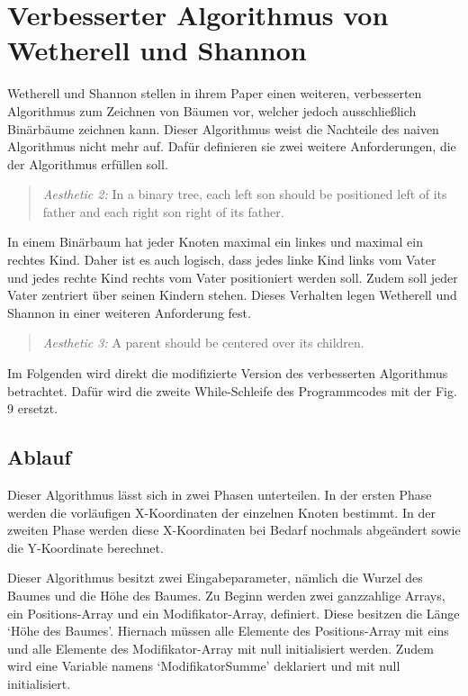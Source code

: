\label{chap:kapitel3_2}
\section{Verbesserter Algorithmus von Wetherell und Shannon}
Wetherell und Shannon stellen in ihrem Paper einen weiteren, verbesserten Algorithmus zum Zeichnen von Bäumen vor, welcher jedoch
ausschließlich Binärbäume zeichnen kann. Dieser Algorithmus weist die Nachteile des naiven Algorithmus nicht mehr auf.
Dafür definieren sie zwei weitere Anforderungen, die der Algorithmus erfüllen soll.   

\begin{quotation}
	\textit{Aesthetic 2:} In a binary tree, each left son should be positioned
	left of its father and each right son right of its father.\cite[]{q1}
\end{quotation}

In einem Binärbaum hat jeder Knoten maximal ein linkes und maximal ein rechtes Kind. Daher ist es auch logisch, dass jedes linke Kind 
links vom Vater und jedes rechte Kind rechts vom Vater positioniert werden soll. Zudem soll jeder Vater zentriert über seinen Kindern
stehen. Dieses Verhalten legen Wetherell und Shannon in einer weiteren Anforderung fest.

\begin{quotation}
	\textit{Aesthetic 3:} A parent should be centered over its children.\cite[]{q1}
\end{quotation}

Im Folgenden wird direkt die modifizierte Version des verbesserten Algorithmus betrachtet. Dafür wird die zweite While-Schleife des Programmcodes
mit der Fig. 9 \cite[A modification of Algorithm 3]{q1} ersetzt.

\subsection{Ablauf}

Dieser Algorithmus lässt sich in zwei Phasen unterteilen. In der ersten Phase werden die vorläufigen X-Koordinaten der einzelnen Knoten bestimmt.
In der zweiten Phase werden diese X-Koordinaten bei Bedarf nochmals abgeändert sowie die Y-Koordinate berechnet.

Dieser Algorithmus besitzt zwei Eingabeparameter, nämlich die Wurzel des Baumes und die Höhe des Baumes. Zu Beginn werden zwei
ganzzahlige Arrays, ein Positions-Array und ein Modifikator-Array, definiert. Diese besitzen die Länge ‘Höhe des Baumes’.
Hiernach müssen alle Elemente des Positions-Array mit eins und alle Elemente des Modifikator-Array mit null initialisiert werden.
Zudem wird eine Variable namens ‘ModifikatorSumme’ deklariert und mit null initialisiert.

